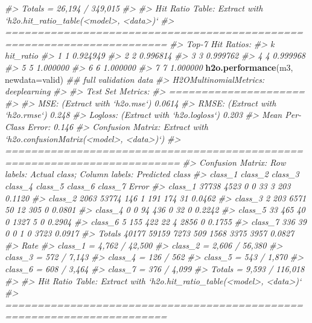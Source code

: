 \documentclass[]{book}
\newenvironment{Shaded}{\begin{snugshade}}{\end{snugshade}}
\newcommand{\CommentTok}[1]{\textcolor[rgb]{0.56,0.35,0.01}{\textit{#1}}}
\newcommand{\DataTypeTok}[1]{\textcolor[rgb]{0.13,0.29,0.53}{#1}}
\newcommand{\KeywordTok}[1]{\textcolor[rgb]{0.13,0.29,0.53}{\textbf{#1}}}
\newcommand{\NormalTok}[1]{#1}
\begin{document}
\begin{Shaded}
\begin{Highlighting}[]
\CommentTok{#> Totals  = 26,194 / 349,015}
\CommentTok{#> }
\CommentTok{#> Hit Ratio Table: Extract with `h2o.hit_ratio_table(<model>, <data>)`}
\CommentTok{#> =======================================================================}
\CommentTok{#> Top-7 Hit Ratios: }
\CommentTok{#>   k hit_ratio}
\CommentTok{#> 1 1  0.924949}
\CommentTok{#> 2 2  0.996814}
\CommentTok{#> 3 3  0.999762}
\CommentTok{#> 4 4  0.999968}
\CommentTok{#> 5 5  1.000000}
\CommentTok{#> 6 6  1.000000}
\CommentTok{#> 7 7  1.000000}
\KeywordTok{h2o.performance}\NormalTok{(m3, }\DataTypeTok{newdata=}\NormalTok{valid)    }\CommentTok{## full validation data}
\CommentTok{#> H2OMultinomialMetrics: deeplearning}
\CommentTok{#> }
\CommentTok{#> Test Set Metrics: }
\CommentTok{#> =====================}
\CommentTok{#> }
\CommentTok{#> MSE: (Extract with `h2o.mse`) 0.0614}
\CommentTok{#> RMSE: (Extract with `h2o.rmse`) 0.248}
\CommentTok{#> Logloss: (Extract with `h2o.logloss`) 0.203}
\CommentTok{#> Mean Per-Class Error: 0.146}
\CommentTok{#> Confusion Matrix: Extract with `h2o.confusionMatrix(<model>, <data>)`)}
\CommentTok{#> =========================================================================}
\CommentTok{#> Confusion Matrix: Row labels: Actual class; Column labels: Predicted class}
\CommentTok{#>         class_1 class_2 class_3 class_4 class_5 class_6 class_7  Error}
\CommentTok{#> class_1   37738    4523       0       0      33       3     203 0.1120}
\CommentTok{#> class_2    2063   53774     146       1     191     174      31 0.0462}
\CommentTok{#> class_3       2     203    6571      50      12     305       0 0.0801}
\CommentTok{#> class_4       0       0      94     436       0      32       0 0.2242}
\CommentTok{#> class_5      33     465      40       0    1327       5       0 0.2904}
\CommentTok{#> class_6       5     155     422      22       4    2856       0 0.1755}
\CommentTok{#> class_7     336      39       0       0       1       0    3723 0.0917}
\CommentTok{#> Totals    40177   59159    7273     509    1568    3375    3957 0.0827}
\CommentTok{#>                      Rate}
\CommentTok{#> class_1 =  4,762 / 42,500}
\CommentTok{#> class_2 =  2,606 / 56,380}
\CommentTok{#> class_3 =     572 / 7,143}
\CommentTok{#> class_4 =       126 / 562}
\CommentTok{#> class_5 =     543 / 1,870}
\CommentTok{#> class_6 =     608 / 3,464}
\CommentTok{#> class_7 =     376 / 4,099}
\CommentTok{#> Totals  = 9,593 / 116,018}
\CommentTok{#> }
\CommentTok{#> Hit Ratio Table: Extract with `h2o.hit_ratio_table(<model>, <data>)`}
\CommentTok{#> =======================================================================}

\end{Highlighting}
\end{Shaded}
\end{document}
